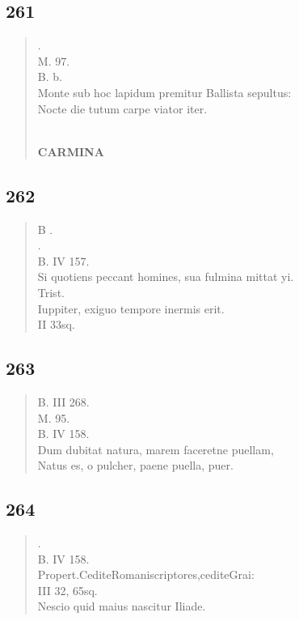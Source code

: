 \documentclass[11pt, a4paper]{report}
\begin{document}
            \subsection*{261}
      \begin{verse}
      . \\ M. 97. \\  \lbrack B. b. \\ Monte sub hoc lapidum premitur Ballista sepultus: \\ Nocte die tutum carpe viator iter. \\ 
        ﻿\pagebreak 
    \begin{center} \textbf{CARMINA} \end{center} \marginpar{[214]} 
      \end{verse}
  
            \subsection*{262}
      \begin{verse}
      B . \\ . \\ B. IV 157. \\ Si quotiens peccant homines, sua fulmina mittat yi. \\ Trist. \\ Iuppiter, exiguo tempore inermis erit. \\ II 33sq. \\ 
      \end{verse}
  
            \subsection*{263}
      \begin{verse}
      B. III 268. \\ M. 95. \\ B. IV 158. \\ Dum dubitat natura, marem faceretne puellam, \\ Natus es, o pulcher, paene puella, puer. \\ 
      \end{verse}
  
            \subsection*{264}
      \begin{verse}
      . \\ B. IV 158. \\ Propert.CediteRomaniscriptores,cediteGrai: \\ III 32, 65sq. \\ Nescio quid maius nascitur Iliade. \\ 
      \end{verse}
  
\end{document}
